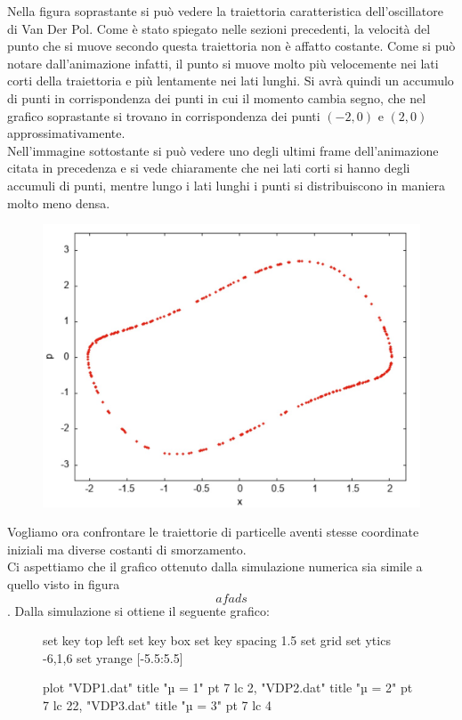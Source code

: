 \documentclass[12pt]{article}
\begin{document}
Nella figura soprastante si può vedere la traiettoria caratteristica dell'oscillatore di Van Der Pol. Come è stato spiegato nelle sezioni precedenti, la velocità del punto che si muove secondo questa traiettoria non è affatto costante.
Come si può notare dall'animazione infatti, il punto si muove molto più velocemente nei lati corti della traiettoria e più lentamente nei lati lunghi. Si avrà quindi un accumulo di punti in corrispondenza dei punti in cui il momento cambia segno,
che nel grafico soprastante si trovano in corrispondenza dei punti $(-2,0)$ e $(2,0)$ approssimativamente. \\
Nell'immagine sottostante si può vedere uno degli ultimi frame dell'animazione citata in precedenza e si vede chiaramente che nei lati corti si hanno degli accumuli di punti, mentre lungo i lati lunghi i punti si distribuiscono in maniera molto meno densa. 
\begin{figure}[H]
	\centering
	\includegraphics[scale = 0.4]{Frame animazione}
\end{figure}
Vogliamo ora confrontare le traiettorie di particelle aventi stesse coordinate iniziali ma diverse costanti di smorzamento. \\
Ci aspettiamo che il grafico ottenuto dalla simulazione numerica sia simile a quello visto in figura $$ afads $$. Dalla simulazione si ottiene il seguente grafico:
\begin{figure}[H]
	\centering
	\begin{gnuplot}[terminal = epslatex, terminaloptions = color, terminaloptions = {size 12cm,18cm}]
		set key top left
		set key box
		set key spacing 1.5
		set grid
		set ytics -6,1,6
		set yrange [-5.5:5.5]
    
		plot "VDP1.dat" title "µ = 1" pt 7 lc 2, "VDP2.dat" title "µ = 2" pt 7 lc 22, "VDP3.dat" title "µ = 3" pt 7 lc 4
	\end{gnuplot}
\end{figure}
\end{document}
